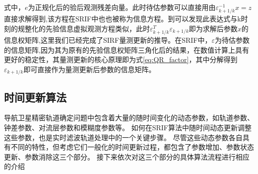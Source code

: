 式中，\(e\)为正规化后的验后观测残差向量。此时待估参数可以直接用由\(\varepsilon_{k+1/k}^{-1}x=z\)直接求解得到,该方程在SRIF中也也被称为信息方程。到可以发现此表达式与k时刻的规整化的先验信息虚拟观测方程类似，此时\(\varepsilon_{k+1/k}^{T}\varepsilon_{k+1/k}\)即为求解后参数\(x\)的信息权矩阵,这里我们已经完成了SIRF量测更新的推导。在SRIF中，\(\varepsilon\)为待估参数的信息矩阵,因为其为原有的先验信息权矩阵三角化后的结果，在数值计算上具有更好的稳定性，其量测更新的核心原理即为式\eqref{eq:QR_factor}，其中分解得到\(\varepsilon_{k+1/k}\)即可直接作为量测更新后参数的信息矩阵。

\subsection{时间更新算法}

导航卫星精密轨道确定问题中包含着大量的随时间变化的动态参数，如轨道参数、钟差参数、对流层参数和模糊度参数等。
如何在SRIF算法中随时间动态更新调整这些参数，也是实时滤波轨道处理中的一个关键步骤。
尽管这些动态参数各自具有不同的特性，但考虑它们一般化的时间更新过程，都包含了参数增加、参数状态更新、参数消除这三个部分。
接下来依次对这三个部分的具体算法流程进行相应的介绍

